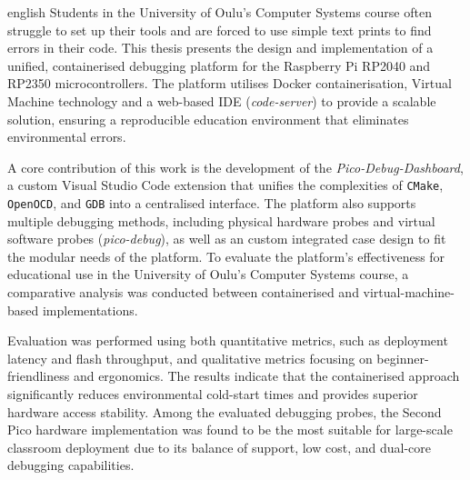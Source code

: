 
\begin{thesisabstract}{english}
  \abstractmetadata
Students in the University of Oulu’s Computer Systems course often struggle to set up their tools and are forced to use simple text prints to find errors in their code. This thesis presents the design and implementation of a unified, containerised debugging platform for the Raspberry Pi RP2040 and RP2350 microcontrollers. The platform utilises Docker containerisation, Virtual Machine technology and a web-based IDE (\textit{code-server}) to provide a scalable solution, ensuring a reproducible education environment that eliminates environmental errors.

A core contribution of this work is the development of the \textit{Pico-Debug-Dashboard}, a custom Visual Studio Code extension that unifies the complexities of \texttt{CMake}, \texttt{OpenOCD}, and \texttt{GDB} into a centralised interface. The platform also supports multiple debugging methods, including physical hardware probes and virtual software probes (\textit{pico-debug}), as well as an custom integrated case design to fit the modular needs of the platform. To evaluate the platform's effectiveness for educational use in the University of Oulu’s Computer Systems course, a comparative analysis was conducted between containerised and virtual-machine-based implementations.

Evaluation was performed using both quantitative metrics, such as deployment latency and flash throughput, and qualitative metrics focusing on beginner-friendliness and ergonomics. The results indicate that the containerised approach significantly reduces environmental cold-start times and provides superior hardware access stability. Among the evaluated debugging probes, the Second Pico hardware implementation was found to be the most suitable for large-scale classroom deployment due to its balance of support, low cost, and dual-core debugging capabilities.
\end{thesisabstract}
